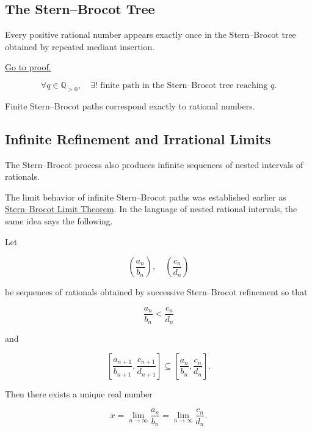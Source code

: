 \subsection*{The Stern--Brocot Tree}

\begin{theorem}
\label{thm:stern-brocot}

Every positive rational number appears exactly once in the
Stern--Brocot tree obtained by repeated mediant insertion.

\hyperref[prf:stern-brocot]{Go to proof.}
\end{theorem}

\begin{remark*}

\[
\forall q\in\mathbb{Q}_{>0},
\quad
\exists ! \text{ finite path in the Stern--Brocot tree reaching } q.
\]

\end{remark*}

\begin{remark*}[Consequence]

Finite Stern--Brocot paths correspond exactly to rational numbers.

\end{remark*}

\begin{exposition}
\bigskip
\end{exposition}

\subsection*{Infinite Refinement and Irrational Limits}

\begin{exposition}
The Stern--Brocot process also produces infinite sequences of nested
intervals of rationals.
\end{exposition}

\begin{remark*}
The limit behavior of infinite Stern--Brocot paths was established earlier as
\hyperref[thm:stern-brocot-limit]{Stern--Brocot Limit Theorem}. In the language
of nested rational intervals, the same idea says the following.

Let

\[
\left(\frac{a_n}{b_n}\right),\quad
\left(\frac{c_n}{d_n}\right)
\]

be sequences of rationals obtained by successive Stern--Brocot
refinement so that

\[
\frac{a_n}{b_n}
<
\frac{c_n}{d_n}
\]

and

\[
\left[\frac{a_{n+1}}{b_{n+1}},\frac{c_{n+1}}{d_{n+1}}\right]
\subseteq
\left[\frac{a_n}{b_n},\frac{c_n}{d_n}\right].
\]

Then there exists a unique real number

\[
x
=
\lim_{n\to\infty}\frac{a_n}{b_n}
=
\lim_{n\to\infty}\frac{c_n}{d_n}.
\]

\end{remark*}


